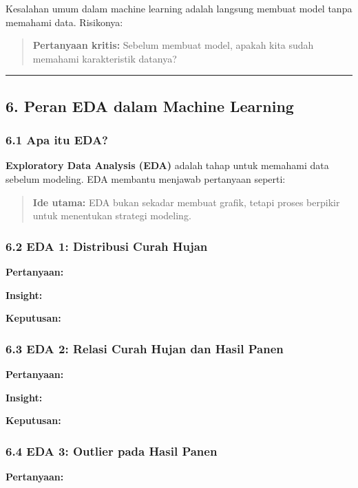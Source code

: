 \documentclass[12pt,a4paper]{article}
\begin{document}
Kesalahan umum dalam machine learning adalah langsung membuat model tanpa memahami data. Risikonya:



\begin{quote}
\textbf{Pertanyaan kritis:} Sebelum membuat model, apakah kita sudah memahami karakteristik datanya?\end{quote}


\hrule


\subsection{6. Peran EDA dalam Machine Learning}

\subsubsection{6.1 Apa itu EDA?}

\textbf{Exploratory Data Analysis (EDA)} adalah tahap untuk memahami data sebelum modeling. EDA membantu menjawab pertanyaan seperti:



\begin{quote}
\textbf{Ide utama:} EDA bukan sekadar membuat grafik, tetapi proses berpikir untuk menentukan strategi modeling.\end{quote}


\subsubsection{6.2 EDA 1: Distribusi Curah Hujan}

\textbf{Pertanyaan:}


\textbf{Insight:}


\textbf{Keputusan:}


\subsubsection{6.3 EDA 2: Relasi Curah Hujan dan Hasil Panen}

\textbf{Pertanyaan:}


\textbf{Insight:}


\textbf{Keputusan:}


\subsubsection{6.4 EDA 3: Outlier pada Hasil Panen}

\textbf{Pertanyaan:}
\end{document}
